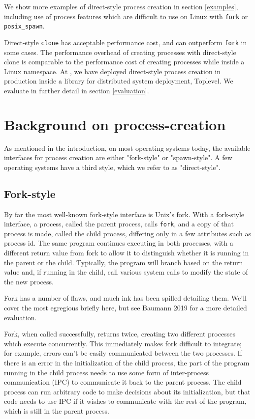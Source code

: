 \documentclass[letterpaper,twocolumn,10pt]{article}
\begin{document}
We show more examples of direct-style process creation in section \ref{examples},
including use of process features which are difficult to use on Linux with \texttt{fork} or \texttt{posix\_spawn}.

Direct-style \texttt{clone} has acceptable performance cost,
and can outperform \texttt{fork} in some cases.
The performance overhead of creating processes with direct-style clone
is comparable to the performance cost of creating processes while inside a Linux namespace.
At \twosigma, we have deployed direct-style process creation in production
inside a library for distributed system deployment, Toplevel.
We evaluate in further detail in section \ref{evaluation}.
\section{Background on process-creation}\label{background}
As mentioned in the introduction,
on most operating systems today,
the available interfaces for process creation
are either "fork-style" or "spawn-style".
A few operating systems have a third style, which we refer to as "direct-style".

\subsection{Fork-style}
By far the most well-known fork-style interface is Unix's fork.\cite{forkhist}
With a fork-style interface,
a process, called the parent process, calls \texttt{fork},
and a copy of that process is made,
called the child process,
differing only in a few attributes such as process id.
The same program continues executing in both processes,
with a different return value from fork to allow it to distinguish whether it is running in the parent or the child.
Typically, the program will branch based on the return value
and, if running in the child,
call various system calls to modify the state of the new process.

Fork has a number of flaws,
and much ink has been spilled detailing them.
We'll cover the most egregious briefly here,
but see Baumann 2019 \cite{forkroad} for a more detailed evaluation.

Fork, when called successfully, returns twice,
creating two different processes which execute concurrently.
This immediately makes fork difficult to integrate;
for example, errors can't be easily communicated between the two processes.
If there is an error in the initialization of the child process,
the part of the program running in the child process
needs to use some form of inter-process communication (IPC) to communicate it back to the parent process.
The child process can run arbitrary code to make decisions about its initialization,
but that code needs to use IPC if it wishes to communicate with the rest of the program,
which is still in the parent process.
\end{document}
